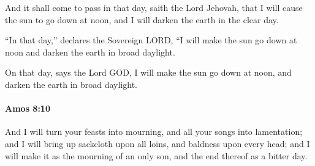 			\begin{versebox}
					\item[BHS] 
					\item[LXX] 
					\item[ASV] And it shall come to pass in that day, saith the Lord Jehovah, that I will cause the sun to go down at noon, and I will darken the earth in the clear day.
					\item[NIV] “In that day,” declares the Sovereign LORD, “I will make the sun go down at noon and darken the earth in broad daylight.
					\item[NRSV] On that day, says the Lord GOD, I will make the sun go down at noon, and darken the earth in broad daylight.
			\end{versebox}

		\paragraph{Amos 8:10} %
			\label{AMOS-8-10}

			And I will turn your feasts into mourning, and all your songs into lamentation; and I will bring up sackcloth upon all loins, and baldness upon every head; and I will make it as the mourning of an only son, and the end thereof as a bitter day.

